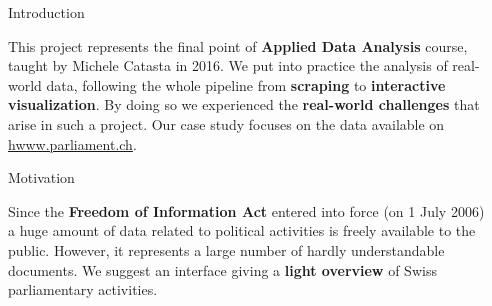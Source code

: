 \documentclass[final]{beamer}
\newlength{\sepwid}
\newlength{\onecolwid}
\begin{document}

\setlength{\belowcaptionskip}{2ex} %
\setlength\belowdisplayshortskip{2ex} %


\begin{frame}[t] %

\begin{columns}[t] %

\begin{column}{\sepwid}\end{column} %

\begin{column}{\onecolwid} %


\begin{block}{Introduction}

This project represents the final point of {\bf Applied Data Analysis} course, taught by Michele Catasta in 2016. We put into practice the analysis of real-world data, following the whole pipeline from {\bf scraping} to {\bf interactive visualization}. By doing so we experienced the \textbf{real-world challenges} that arise in such a project. Our case study focuses on the data available on \url{hwww.parliament.ch}.

\end{block}


\begin{block}{Motivation}

Since the \textbf{Freedom of Information Act} entered into force (on 1 July 2006) a huge amount of data related to political activities is freely available to the public. However, it represents a large number of hardly understandable documents. We suggest an interface giving a \textbf{light overview} of Swiss parliamentary activities.


\end{block}
\end{column}
\end{columns}
\end{frame}
\end{document}

